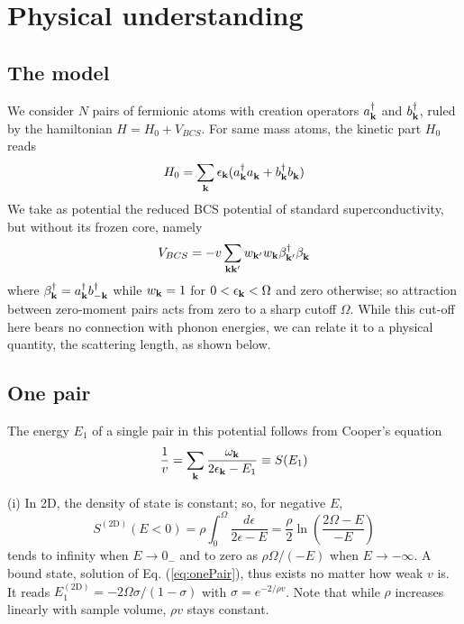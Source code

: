 \documentclass[5p,twocolumn]{elsarticle}
\begin{document}
\section{Physical understanding}
\subsection{The model\label{sec:model}}
We consider $N$ pairs of fermionic atoms with creation operators $a_{\mathbf{k}}^\dagger$ and $b_{\mathbf{k}}^\dagger$, ruled by the hamiltonian
$H=H_{0}+V_{BCS}$. For same mass atoms, the kinetic part $H_0$ reads 
\begin{equation}
H_0=\sum_{\mathbf{k}}\epsilon_{\mathbf{k}}(a^\dagger_{\mathbf{k}}{}a^{}_{\mathbf{k}}+b^\dagger_{\mathbf{k}}{}b^{}_{\mathbf{k}})
\end{equation}
We take as potential  the reduced BCS potential of standard superconductivity, but without its frozen core, namely
\begin{equation}
V_{BCS}=-v\sum_{\mathbf{k}\mathbf{k}'}w_{\mathbf{k}'}w_{\mathbf{k}}\beta^\dagger_{\mathbf{k}'}{}\beta^{}_{\mathbf{k}}
\label{eq:VBcs}
\end{equation}
 where $\beta^\dagger_{\mathbf{k}}=a^\dagger_{\mathbf{k}}b^\dagger_{-\mathbf{k}}$ while $w_{\mathbf{k}}=1$ for $0<\epsilon_{\mathbf{k}}<\Omega$ and zero otherwise; so attraction between zero-moment pairs acts from zero to a sharp cutoff $\Omega$. While this cut-off here bears no connection with phonon energies, we can relate it to a physical quantity,  the scattering length, as shown below.
 \subsection{One pair\label{sec:onePair}}
The energy $E_1$ of a single pair in this potential follows from Cooper's equation
\begin{equation}
\frac{1}{v}=\sum_{\mathbf{k}}\frac{\omega_{\mathbf{k}}}{2\epsilon_{\mathbf{k}}-E_1}\equiv{}S(E_1)
\label{eq:onePair}
\end{equation}

(i) In 2D, the density of state is constant; so, for negative $E$, 
\begin{equation}
S^{(\text{2D})}(E<0)=\rho\int_0^{\Omega}\frac{d\epsilon}{2\epsilon-E}=\frac{\rho}{2}\ln\left(\frac{2\Omega-E}{-E}\right)
\label{eq:s1pair}
\end{equation}
tends to infinity when $E\rightarrow{}0_{-}$ and to zero as $\rho\Omega/(-E)$ when $E\rightarrow-\infty$. A bound state, solution of Eq. (\ref{eq:onePair}), thus exists no matter how weak $v$ is. It reads
$
E_1^{(\text{2D})}=-2\Omega\sigma/(1-\sigma)
$
with $\sigma=e^{-2/\rho{v}}$. Note that while $\rho$ increases linearly with sample volume, $\rho{v}$ stays constant.
\end{document}
